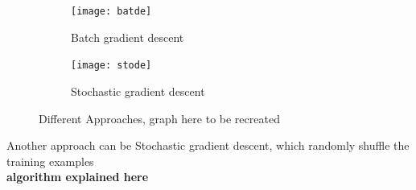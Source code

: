 \begin{figure}[ht]
     \centering
     \hspace{8mm}
     \begin{subfigure}[b]{0.4\textwidth}
         \centering
         \texttt{[image: batde]}
         \caption{Batch gradient descent}
         \label{batde}
     \end{subfigure}
     \hfill
          \begin{subfigure}[b]{0.4\textwidth}
         \centering
         \texttt{[image: stode]}
         \caption{Stochastic gradient descent}
         \label{Stochastic gradient descent}
     \end{subfigure}
          \hspace{8mm}
        \caption{Different Approaches, graph here to be recreated}
        \label{Approaches}
\end{figure}
Another approach can be {Stochastic gradient descent}, which randomly shuffle the training examples 
\\ \textbf{algorithm explained here}